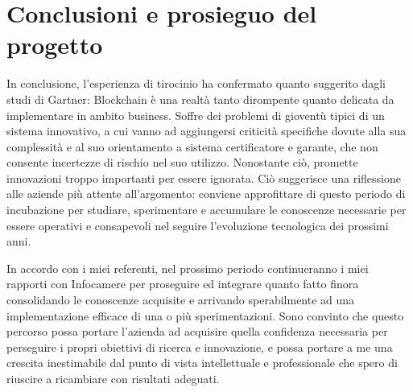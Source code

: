 \section{Conclusioni e prosieguo del progetto}
	In conclusione, l'esperienza di tirocinio ha confermato quanto suggerito dagli studi di Gartner: Blockchain è una realtà tanto dirompente quanto delicata da implementare in ambito business. Soffre dei problemi di gioventù tipici di un sistema innovativo, a cui vanno ad aggiungersi criticità specifiche dovute alla sua complessità e al suo orientamento a sistema certificatore e garante, che non consente incertezze di rischio nel suo utilizzo. Nonostante ciò, promette innovazioni troppo importanti per essere ignorata. Ciò suggerisce una riflessione alle aziende più attente all'argomento: conviene approfittare di questo periodo di incubazione per studiare, sperimentare e accumulare le conoscenze necessarie per essere operativi e consapevoli nel seguire l'evoluzione tecnologica dei prossimi anni. 
	
	In accordo con i miei referenti, nel prossimo periodo continueranno i miei rapporti con Infocamere per proseguire ed integrare quanto fatto finora consolidando le conoscenze acquisite e arrivando sperabilmente ad una implementazione efficace di una o più sperimentazioni. Sono convinto che questo percorso possa portare l'azienda ad acquisire quella confidenza necessaria per perseguire i propri obiettivi di ricerca e innovazione, e possa portare a me una crescita inestimabile dal punto di vista intellettuale e professionale che spero di riuscire a ricambiare con risultati adeguati.
	
	
	
	
	
	
	
	
	
	
	
	
	
	
	
	
	
	
	
	
	
	